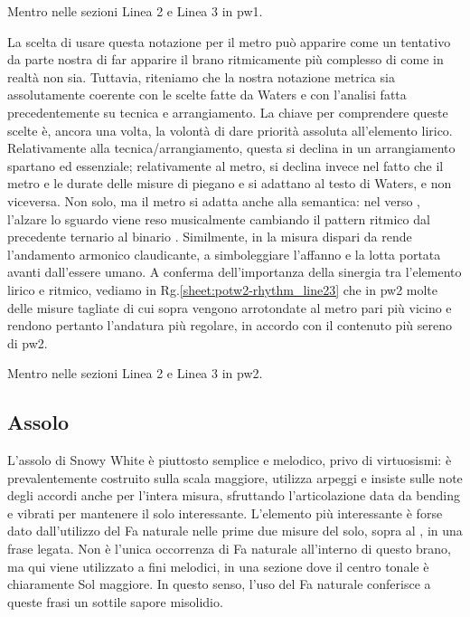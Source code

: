 \documentclass[class=book, crop=false, oneside, 12pt]{standalone}
\begin{document}
    \begin{sheet}[htbp]
        \centering
        \caption{Mentro nelle sezioni Linea 2 e Linea 3 in \acrshort{pw1}.}
        \label{sheet:potw1-rhythm_line23}
    \end{sheet}
    
    La scelta di usare questa notazione per il metro può apparire come un tentativo da parte nostra di far apparire il brano ritmicamente più complesso di come in realtà non sia. Tuttavia, riteniamo che la nostra notazione metrica sia assolutamente coerente con le scelte fatte da Waters e con l'analisi fatta precedentemente su tecnica e arrangiamento. La chiave per comprendere queste scelte è, ancora una volta, la volontà di dare priorità assoluta all'elemento lirico. Relativamente alla tecnica/arrangiamento, questa si declina in un arrangiamento spartano ed essenziale; relativamente al metro, si declina invece nel fatto che il metro e le durate delle misure di piegano e si adattano al testo di Waters, e non viceversa. Non solo, ma il metro si adatta anche alla semantica: nel verso , l'alzare lo sguardo viene reso musicalmente cambiando il pattern ritmico dal precedente ternario  al binario . Similmente, in  la misura dispari da  rende l'andamento armonico claudicante, a simboleggiare l'affanno e la lotta portata avanti dall'essere umano. A conferma dell'importanza della sinergia tra l'elemento lirico e ritmico, vediamo in Rg.\ref{sheet:potw2-rhythm_line23} che in \acrshort{pw2} molte delle misure tagliate di cui sopra vengono arrotondate al metro pari più vicino e rendono pertanto l'andatura più regolare, in accordo con il contenuto più sereno di \acrshort{pw2}.

    \begin{sheet}[htbp]
        \centering
        \caption{Mentro nelle sezioni Linea 2 e Linea 3 in \acrshort{pw2}.}
        \label{sheet:potw2-rhythm_line23}
    \end{sheet}
    
    \subsection{Assolo}
    L'assolo di Snowy White è piuttosto semplice e melodico, privo di virtuosismi: è prevalentemente costruito sulla scala maggiore, utilizza arpeggi e insiste sulle note degli accordi anche per l'intera misura, sfruttando l'articolazione data da bending e vibrati per mantenere il solo interessante. L'elemento più interessante è forse dato dall'utilizzo del Fa naturale nelle prime due misure del solo, sopra al , in una frase legata. Non è l'unica occorrenza di Fa naturale all'interno di questo brano, ma qui viene utilizzato a fini melodici, in una sezione dove il centro tonale è chiaramente Sol maggiore. In questo senso, l'uso del Fa naturale conferisce a queste frasi un sottile sapore misolidio.
    
\end{document}
